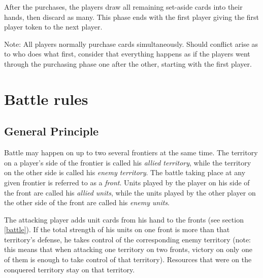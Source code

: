 \documentclass[a4paper]{article}
\begin{document}
        After the purchases, the players draw all remaining set-aside cards into their
        hands, then discard as many.        
        This phase ends with the first player giving the first player token
        to the next player.
        
        Note: All players normally purchase cards simultaneously.
        Should conflict arise as to who does what first,
        consider that everything happens as if the players went through
        the purchasing phase one after the other, starting with the first player.


\newpage
\section{Battle rules}
    \label{battle-rules}
    
    \subsection{General Principle}
        Battle may happen on up to two several frontiers at the same time.
        The territory on a player's side of the frontier is called his \textit{allied territory},
        while the territory on the other side is called his \textit{enemy territory}.
        The battle taking place at any given frontier is referred to as a \textit{front}.
        Units played by the player on his side of the front are called his
        \textit{allied units}, while the units played by the other player on the other
        side of the front are called his \textit{enemy units}.
        
        The attacking player adds unit cards from his hand to the fronts
        (see section \ref{battle}).
        If the total strength of his units on one front is more than that territory's
        defense, he takes control of the corresponding enemy territory
        (note: this means that when attacking one territory on two fronts,
        victory on only one of them is enough to take control of that territory).
        Resources that were on the conquered territory stay on that territory.
        
\end{document}
